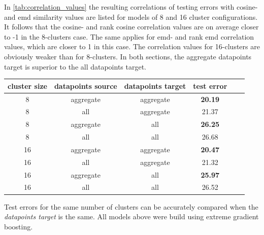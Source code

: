 \documentclass{ws-ijait}
\begin{document}
		In \cref{tab:correlation_values} the resulting correlations of testing errors with cosine- and emd similarity values are listed for models of 8 and 16 cluster configurations. It follows that the cosine- and rank cosine correlation values are on average closer to -1 in the 8-clusters case. The same applies for emd- and rank emd correlation values, which are closer to 1 in this case. The correlation values for 16-clusters are obviously weaker than for 8-clusters. In both sections, the aggregate datapoints target is superior to the all datapoints target.
		
		\begin{table}[!ht]
			{\begin{tabular}{ | c | c | c | c | c | c | }
					\hline
					{cluster size} & {datapoints source} & {datapoints target} & {test error} \\ \hline
					8	&	aggregate 	&	aggregate 	& 	\textbf{20.19} 	\\ \hline
					8	&	all 		&	aggregate 	& 	21.37	\\ \hline \hline
					8	&	aggregate 	&	all 		& 	\textbf{26.25}	\\ \hline
					8	&	all			& 	all 		&	26.68	\\ \hline \hline
					16	&	aggregate	& 	aggregate 	&	\textbf{20.47}	\\ \hline
					16	&	all			& 	aggregate 	& 	21.32	\\ \hline \hline
					16	&	aggregate	& 	all 		& 	\textbf{25.97}	\\ \hline
					16	&	all			&	all 		&	26.52	\\ \hline \hline
			\end{tabular}}
			\label{tab:train_test_errors}
			\begin{tabnote}
				Test errors for the same number of clusters can be accurately compared when the \textit{datapoints target} is the same. All models above were build using extreme gradient boosting.
			\end{tabnote}
		\end{table}
			
\end{document}
